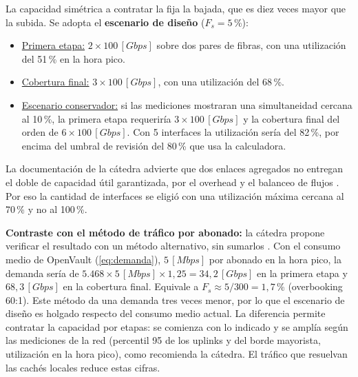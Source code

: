 La capacidad simétrica a contratar la fija la bajada, que es diez veces mayor que la subida. Se adopta el \textbf{escenario de diseño} ($F_s = 5$\,\%):
\begin{itemize}
    \item \underline{Primera etapa:} \textbf{$2 \times 100 \, [Gbps]$} sobre dos pares de fibras, con una utilización del 51\,\% en la hora pico.
    \item \underline{Cobertura final:} \textbf{$3 \times 100 \, [Gbps]$}, con una utilización del 68\,\%.
    \item \underline{Escenario conservador:} si las mediciones mostraran una simultaneidad cercana al 10\,\%, la primera etapa requeriría $3 \times 100 \, [Gbps]$ y la cobertura final del orden de $6 \times 100 \, [Gbps]$. Con 5 interfaces la utilización sería del 82\,\%, por encima del umbral de revisión del 80\,\% que usa la calculadora.
\end{itemize}
La documentación de la cátedra advierte que dos enlaces agregados no entregan el doble de capacidad útil garantizada, por el overhead y el balanceo de flujos \cite{doc_backhaul}. Por eso la cantidad de interfaces se eligió con una utilización máxima cercana al 70\,\% y no al 100\,\%.

\textbf{Contraste con el método de tráfico por abonado:} la cátedra propone verificar el resultado con un método alternativo, sin sumarlos \cite{doc_backhaul}. Con el consumo medio de OpenVault (\autoref{eq:demanda}), $5 \, [Mbps]$ por abonado en la hora pico, la demanda sería de $5.468 \times 5 \, [Mbps] \times 1{,}25 = 34{,}2 \, [Gbps]$ en la primera etapa y $68{,}3 \, [Gbps]$ en la cobertura final. Equivale a $F_s \approx 5 / 300 = 1{,}7$\,\% (overbooking 60:1). Este método da una demanda tres veces menor, por lo que el escenario de diseño es holgado respecto del consumo medio actual. La diferencia permite contratar la capacidad por etapas: se comienza con lo indicado y se amplía según las mediciones de la red (percentil 95 de los uplinks y del borde mayorista, utilización en la hora pico), como recomienda la cátedra. El tráfico que resuelvan las cachés locales reduce estas cifras.

